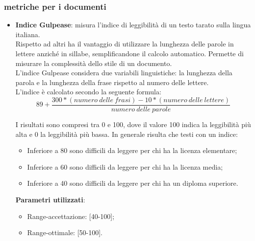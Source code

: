 {\subsubsection{metriche per i documenti}{
	\label{sec:metricadocumenti}
	\begin{itemize}
		\item \textbf{Indice Gulpease}: misura l'indice di leggibilità di un testo tarato sulla lingua italiana.\\
		Rispetto ad altri ha il vantaggio di utilizzare la lunghezza delle parole in lettere anziché in sillabe, semplificandone il calcolo automatico. Permette di misurare la complessità dello stile di un documento.\\
		L'indice Gulpease considera due variabili linguistiche: la lunghezza della parola e la lunghezza della frase rispetto al numero delle lettere.\\
		L'indice è calcolato secondo la seguente formula:\\
		
		\[89 + \frac{300 *(numero\ delle\ frasi) -10 *(numero\ delle\ lettere)}{numero\ delle\ parole}\]
		
		I risultati sono compresi tra 0 e 100, dove il valore 100 indica la leggibilità più alta e 0 la leggibilità più bassa. In generale risulta che testi con un indice:
		
		\begin{itemize}
			\item Inferiore a 80 sono difficili da leggere per chi ha la licenza elementare;
			\item Inferiore a 60 sono difficili da leggere per chi ha la licenza media;
			\item Inferiore a 40 sono difficili da leggere per chi ha un diploma superiore.
		\end{itemize}
		
		\textbf{Parametri utilizzati}:
		\begin{itemize}
			\item Range-accettazione: [40-100];
			\item Range-ottimale: [50-100].
		\end{itemize}
	\end{itemize}
	}
}